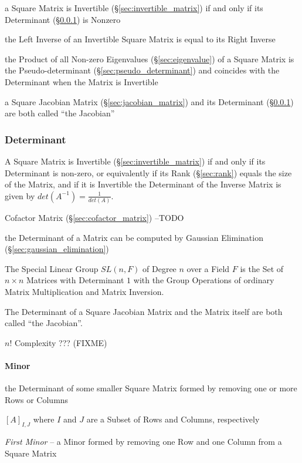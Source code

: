 a Square Matrix is Invertible (\S\ref{sec:invertible_matrix}) if and only if
its Determinant (\S\ref{sec:determinant}) is Nonzero

the Left Inverse of an Invertible Square Matrix is equal to its Right Inverse

the Product of all Non-zero Eigenvalues (\S\ref{sec:eigenvalue}) of a Square
Matrix is the Pseudo-determinant (\S\ref{sec:pseudo_determinant}) and coincides
with the Determinant when the Matrix is Invertible

a Square Jacobian Matrix (\S\ref{sec:jacobian_matrix}) and its Determinant
(\S\ref{sec:determinant}) are both called ``the Jacobian''



\subsubsection{Determinant}\label{sec:determinant}

A Square Matrix is Invertible (\S\ref{sec:invertible_matrix}) if and only if
its Determinant is non-zero, or equivalently if its Rank (\S\ref{sec:rank})
equals the size of the Matrix, and if it is Invertible the Determinant of the
Inverse Matrix is given by $det(A^{-1}) = \frac{1}{det(A)}$.

Cofactor Matrix (\S\ref{sec:cofactor_matrix}) --TODO

\fist the Determinant of a Matrix can be computed by Gaussian Elimination
(\S\ref{sec:gaussian_elimination})

The Special Linear Group $SL(n,F)$ of Degree $n$ over a Field $F$ is the Set of
$n \times n$ Matrices with Determinant $1$ with the Group Operations of
ordinary Matrix Multiplication and Matrix Inversion.

The Determinant of a Square Jacobian Matrix and the Matrix itself are both
called ``the Jacobian''.

$n!$ Complexity ??? (FIXME)



\paragraph{Minor}\label{sec:minor}\hfill

the Determinant of some smaller Square Matrix formed by removing one or more
Rows or Columns

$[A]_{I,J}$ where $I$ and $J$ are a Subset of Rows and Columns, respectively

\emph{First Minor} -- a Minor formed by removing one Row and one Column from a
Square Matrix

